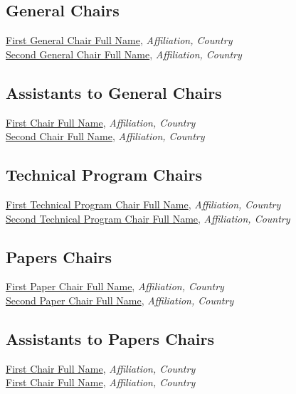 
\subsection{General Chairs}
\href{https://orcid.org/0000-0001-2345-6789}{First General Chair Full Name}, \emph{Affiliation, Country}\\
\href{https://orcid.org/0000-0001-2345-6789}{Second General Chair Full Name}, \emph{Affiliation, Country}\\

\subsection{Assistants to General Chairs}
\href{https://orcid.org/0000-0001-2345-6789}{First Chair Full Name}, \emph{Affiliation, Country}\\
\href{https://orcid.org/0000-0001-2345-6789}{Second Chair Full Name}, \emph{Affiliation, Country}\\

\subsection{Technical Program Chairs}
\href{https://orcid.org/0000-0001-2345-6789}{First Technical Program Chair Full Name}, \emph{Affiliation, Country}\\
\href{https://orcid.org/0000-0001-2345-6789}{Second Technical Program Chair Full Name}, \emph{Affiliation, Country}\\

\subsection{Papers Chairs}
\href{https://orcid.org/0000-0001-2345-6789}{First Paper Chair Full Name}, \emph{Affiliation, Country}\\
\href{https://orcid.org/0000-0001-2345-6789}{Second Paper Chair Full Name}, \emph{Affiliation, Country}\\

\subsection{Assistants to Papers Chairs}
\href{https://orcid.org/0000-0001-2345-6789}{First Chair Full Name}, \emph{Affiliation, Country}\\
\href{https://orcid.org/0000-0001-2345-6789}{First Chair Full Name}, \emph{Affiliation, Country}\\

